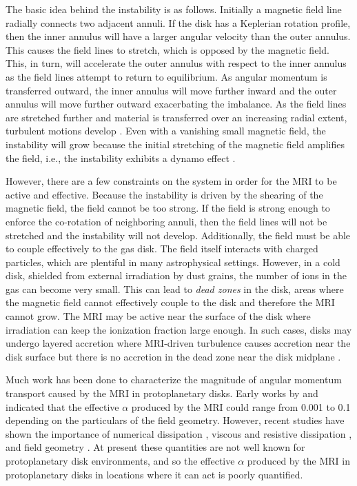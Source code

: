 The basic idea behind the instability is as follows. Initially a magnetic field line radially connects two adjacent annuli. If the disk has a Keplerian rotation profile, then the inner annulus will have a larger angular velocity than the outer annulus. This causes the field lines to stretch, which is opposed by the magnetic field. This, in turn, will accelerate the outer annulus with respect to the inner annulus as the field lines attempt to return to equilibrium. As angular momentum is transferred outward, the inner annulus will move further inward and the outer annulus will move further outward exacerbating the imbalance. As the field lines are stretched further and material is transferred over an increasing radial extent, turbulent motions develop \citep{hawley1995}. Even with a vanishing small magnetic field, the instability will grow because the initial stretching of the magnetic field amplifies the field, i.e., the instability exhibits a dynamo effect \citep{hawley1996}.

However, there are a few constraints on the system in order for the MRI to be active and effective. Because the instability is driven by the shearing of the magnetic field, the field cannot be too strong. If the field is strong enough to enforce the co-rotation of neighboring annuli, then the field lines will not be stretched and the instability will not develop. Additionally, the field must be able to couple effectively to the gas disk. The field itself interacts with charged particles, which are plentiful in many astrophysical settings. However, in a cold disk, shielded from external irradiation by dust grains, the number of ions in the gas can become very small. This can lead to {\it dead zones} in the disk, areas where the magnetic field cannot effectively couple to the disk and therefore the MRI cannot grow. The MRI may be active near the surface of the disk where irradiation can keep the ionization fraction large enough. In such cases, disks may undergo layered accretion where MRI-driven turbulence causes accretion near the disk surface but there is no accretion in the dead zone near the disk midplane \citep{gammie1996}. 

Much work has been done to characterize the magnitude of angular momentum transport caused by the MRI in protoplanetary disks. Early works by \citet{hawley1995} and \citet{brandenburg1995} indicated that the effective $\alpha$ \citep{shakura1973} produced by the MRI could range from 0.001 to 0.1 depending on the particulars of the field geometry. However, recent studies have shown the importance of numerical dissipation \citep{fromang2007a}, viscous and resistive dissipation \citep{lesur2007}, and field geometry \citep{simon2009}. At present these quantities are not well known for protoplanetary disk environments, and so the effective $\alpha$ produced by the MRI in protoplanetary disks in locations where it can act is poorly quantified.

